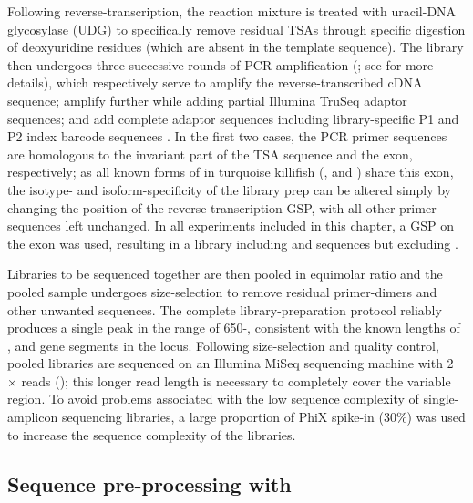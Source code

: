 Following reverse-transcription, the reaction mixture is treated with uracil-DNA glycosylase (UDG) to specifically remove residual TSAs through specific digestion of deoxyuridine residues (which are absent in the template sequence). The library then undergoes three successive rounds of PCR amplification (; see for more details), which respectively serve to amplify the reverse-transcribed cDNA sequence; amplify further while adding partial Illumina TruSeq adaptor sequences; and add complete adaptor sequences including library-specific P1 and P2 index barcode sequences \parencite{vollmers2013consensus}. In the first two cases, the PCR primer sequences are homologous to the invariant part of the TSA sequence and the  exon, respectively; as all known forms of \igh{} in turquoise killifish (,  and ) share this exon, the isotype- and isoform-specificity of the library prep can be altered simply by changing the position of the reverse-transcription GSP, with all other primer sequences left unchanged. In all experiments included in this chapter, a GSP on the  exon was used, resulting in a library including  and  sequences but excluding .

Libraries to be sequenced together are then pooled in equimolar ratio and the pooled sample undergoes size-selection to remove residual primer-dimers and other unwanted sequences. The complete library-preparation protocol reliably produces a single peak in the range of 650-, consistent with the known lengths of \vh, \dh and \jh gene segments in the \Nfu locus. %
Following size-selection and quality control, pooled libraries are sequenced on an Illumina MiSeq sequencing machine with 2 ×  reads (); this longer read length is necessary to completely cover the variable region. To avoid problems associated with the low sequence complexity of single-amplicon sequencing libraries, a large proportion of PhiX spike-in (30\%) was used to increase the sequence complexity of the libraries.

\subsection{Sequence pre-processing with }
\label{sec:igseq_protocol_preprocess}

